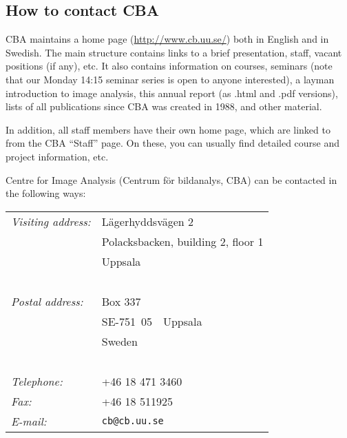 \subsection{How to contact CBA}

CBA maintains a home page (\url{http://www.cb.uu.se/}) both in English and in Swedish. The main structure contains links to a brief presentation, staff, vacant positions (if any), etc. It also contains information on courses, seminars (note that our Monday 14:15 seminar series is open to anyone interested), a layman introduction to image analysis, this annual report (as .html and .pdf versions), lists of all publications since CBA was created in 1988, and other material.

In addition, all staff members have their own home page, which are linked to from the CBA ``Staff'' page. On these, you can usually find detailed course and project information, etc.

Centre for Image Analysis (Centrum f\"{o}r bildanalys, CBA) can be contacted in the following ways:

\begin{tabular}{ll}
\\
\emph{Visiting address:\/} & L\"{a}gerhyddsv\"{a}gen 2\\
&Polacksbacken, building 2, floor 1\\
& Uppsala\\
~\\
\emph{Postal address:\/} & Box 337\\
& SE-751~05~~Uppsala\\
& Sweden\\
~\\
\emph{Telephone:\/} & +46 18 471 3460\\
\emph{Fax:\/} & +46 18 511925\\
\emph{E-mail:\/} & {\tt cb@cb.uu.se}
\end{tabular}

